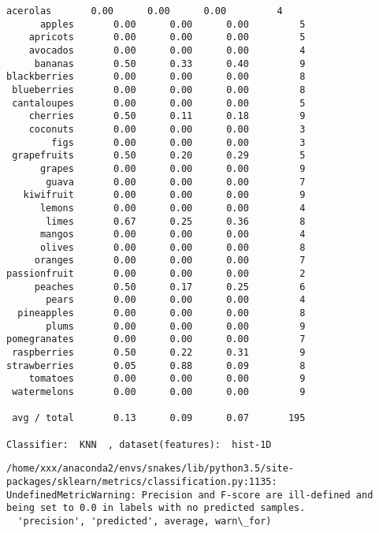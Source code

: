 \documentclass[11pt]{article}
\begin{document}
\begin{Verbatim}[commandchars=\\\{\}]
    acerolas       0.00      0.00      0.00         4
      apples       0.00      0.00      0.00         5
    apricots       0.00      0.00      0.00         5
    avocados       0.00      0.00      0.00         4
     bananas       0.50      0.33      0.40         9
blackberries       0.00      0.00      0.00         8
 blueberries       0.00      0.00      0.00         8
 cantaloupes       0.00      0.00      0.00         5
    cherries       0.50      0.11      0.18         9
    coconuts       0.00      0.00      0.00         3
        figs       0.00      0.00      0.00         3
 grapefruits       0.50      0.20      0.29         5
      grapes       0.00      0.00      0.00         9
       guava       0.00      0.00      0.00         7
   kiwifruit       0.00      0.00      0.00         9
      lemons       0.00      0.00      0.00         4
       limes       0.67      0.25      0.36         8
      mangos       0.00      0.00      0.00         4
      olives       0.00      0.00      0.00         8
     oranges       0.00      0.00      0.00         7
passionfruit       0.00      0.00      0.00         2
     peaches       0.50      0.17      0.25         6
       pears       0.00      0.00      0.00         4
  pineapples       0.00      0.00      0.00         8
       plums       0.00      0.00      0.00         9
pomegranates       0.00      0.00      0.00         7
 raspberries       0.50      0.22      0.31         9
strawberries       0.05      0.88      0.09         8
    tomatoes       0.00      0.00      0.00         9
 watermelons       0.00      0.00      0.00         9

 avg / total       0.13      0.09      0.07       195

Classifier:  KNN  , dataset(features):  hist-1D

    \end{Verbatim}

    \begin{Verbatim}[commandchars=\\\{\}]
/home/xxx/anaconda2/envs/snakes/lib/python3.5/site-packages/sklearn/metrics/classification.py:1135: UndefinedMetricWarning: Precision and F-score are ill-defined and being set to 0.0 in labels with no predicted samples.
  'precision', 'predicted', average, warn\_for)

    \end{Verbatim}
\end{document}
